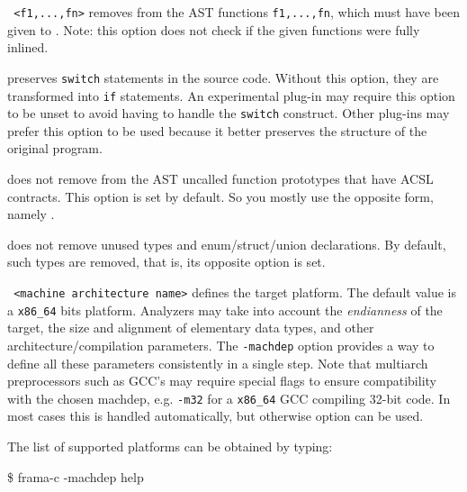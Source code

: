 \begin{description}
\item \texttt{ <f1,...,fn>} removes from the AST
  functions \texttt{f1,...,fn}, which must have been given to
  . Note: this option does not check if the given
  functions were fully inlined.

\item {} preserves \texttt{switch} statements in the
  source code. Without this option, they are transformed into \texttt{if}
  statements. An experimental plug-in may require this option to be unset
  to avoid having to handle the \texttt{switch} construct.
  Other plug-ins may prefer this option to be used because it better
  preserves the structure of the original program.

\item {} does not remove from the
  AST uncalled function prototypes that have ACSL contracts. This option is
  set by default. So you mostly use the opposite form, namely
  .

\item {} does not remove unused types and
  enum/struct/union declarations. By default, such types are removed,
  that is, its opposite option  is set.

\item \texttt{ <machine architecture name>} defines the
  target platform. The default value is a \texttt{x86\_64} bits
  platform. Analyzers may take into account the \emph{endianness} of the
  target, the size and alignment of elementary data types, and other
  architecture/compilation parameters. The \texttt{-machdep} option provides a
  way to define all these parameters consistently in a single step.
  Note that multiarch preprocessors such as GCC's may require special flags
  to ensure compatibility with the chosen machdep, e.g. \texttt{-m32} for a
  \texttt{x86\_64} GCC compiling 32-bit code. In most cases this is handled
  automatically, but otherwise option  can be used.

The list of supported platforms can be obtained by typing:
\begin{frama-c-commands}
\$ frama-c -machdep help
\end{frama-c-commands}


\end{description}
